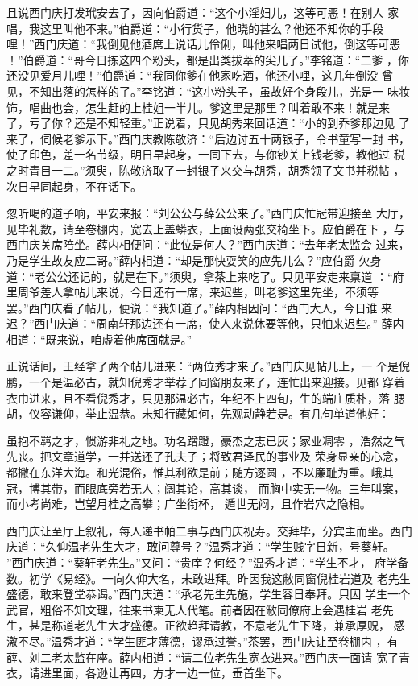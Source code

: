 且说西门庆打发玳安去了，因向伯爵道：“这个小淫妇儿，这等可恶！在别人
家唱，我这里叫他不来。”伯爵道：“小行货子，他晓的甚么？他还不知你的手段
哩！”西门庆道：“我倒见他酒席上说话儿伶俐，叫他来唱两日试他，倒这等可恶
！”伯爵道：“哥今日拣这四个粉头，都是出类拔萃的尖儿了。”李铭道：“二爹
，你还没见爱月儿哩！”伯爵道：“我同你爹在他家吃酒，他还小哩，这几年倒没
曾见，不知出落的怎样的了。”李铭道：“这小粉头子，虽故好个身段儿，光是一
味妆饰，唱曲也会，怎生赶的上桂姐一半儿。爹这里是那里？叫着敢不来！就是来
了，亏了你？还是不知轻重。”正说着，只见胡秀来回话道：“小的到乔爹那边见
了来了，伺候老爹示下。”西门庆教陈敬济：“后边讨五十两银子，令书童写一封
书，使了印色，差一名节级，明日早起身，一同下去，与你钞关上钱老爹，教他过
税之时青目一二。”须臾，陈敬济取了一封银子来交与胡秀，胡秀领了文书并税帖
，次日早同起身，不在话下。

忽听喝的道子响，平安来报：“刘公公与薛公公来了。”西门庆忙冠带迎接至
大厅，见毕礼数，请至卷棚内，宽去上盖蟒衣，上面设两张交椅坐下。应伯爵在下
，与西门庆关席陪坐。薛内相便问：“此位是何人？”西门庆道：“去年老太监会
过来，乃是学生故友应二哥。”薛内相道：“却是那快耍笑的应先儿么？”应伯爵
欠身道：“老公公还记的，就是在下。”须臾，拿茶上来吃了。只见平安走来禀道
：“府里周爷差人拿帖儿来说，今日还有一席，来迟些，叫老爹这里先坐，不须等
罢。”西门庆看了帖儿，便说：“我知道了。”薛内相因问：“西门大人，今日谁
来迟？”西门庆道：“周南轩那边还有一席，使人来说休要等他，只怕来迟些。”
薛内相道：“既来说，咱虚着他席面就是。”

正说话间，王经拿了两个帖儿进来：“两位秀才来了。”西门庆见帖儿上，一
个是倪鹏，一个是温必古，就知倪秀才举荐了同窗朋友来了，连忙出来迎接。见都
穿着衣巾进来，且不看倪秀才，只见那温必古，年纪不上四旬，生的端庄质朴，落
腮胡，仪容谦仰，举止温恭。未知行藏如何，先观动静若是。有几句单道他好：

虽抱不羁之才，惯游非礼之地。功名蹭蹬，豪杰之志已灰；家业凋零
，浩然之气先丧。把文章道学，一并送还了孔夫子；将致君泽民的事业及
荣身显亲的心念，都撇在东洋大海。和光混俗，惟其利欲是前；随方逐圆
，不以廉耻为重。峨其冠，博其带，而眼底旁若无人；阔其论，高其谈，
而胸中实无一物。三年叫案，而小考尚难，岂望月桂之高攀；广坐衔杯，
遁世无闷，且作岩穴之隐相。

西门庆让至厅上叙礼，每人递书帕二事与西门庆祝寿。交拜毕，分宾主而坐。西门
庆道：“久仰温老先生大才，敢问尊号？”温秀才道：“学生贱字日新，号葵轩。
”西门庆道：“葵轩老先生。”又问：“贵庠？何经？”温秀才道：“学生不才，
府学备数。初学《易经》。一向久仰大名，未敢进拜。昨因我这敝同窗倪桂岩道及
老先生盛德，敢来登堂恭谒。”西门庆道：“承老先生先施，学生容日奉拜。只因
学生一个武官，粗俗不知文理，往来书柬无人代笔。前者因在敝同僚府上会遇桂岩
老先生，甚是称道老先生大才盛德。正欲趋拜请教，不意老先生下降，兼承厚贶，
感激不尽。”温秀才道：“学生匪才薄德，谬承过誉。”茶罢，西门庆让至卷棚内
，有薛、刘二老太监在座。薛内相道：“请二位老先生宽衣进来。”西门庆一面请
宽了青衣，请进里面，各逊让再四，方才一边一位，垂首坐下。

